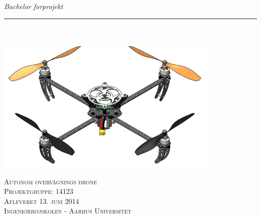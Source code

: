 \thispagestyle{empty}
\begin{flushright}
\vspace{3cm}

\phantom{hul}

\phantom{hul}

\phantom{hul}

\textsl{\Huge Bachelor forprojekt} \\ \vspace{1cm}

\rule{13cm}{3mm} \\ \vspace{1.5cm}
\vspace{1cm}

\includegraphics[width=0.8\textwidth]{Billeder/Forsidebillede.png}

\vspace{4cm} 
\textsc{\Large Autonom overvågnings drone  \\
Projektgruppe: 14123 \\
Afleveret 13. juni 2014\\
Ingeniørhøjskolen - Aarhus Universitet\\}
\end{flushright}

